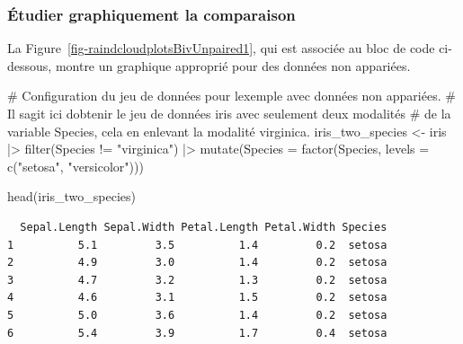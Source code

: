 \documentclass[
  letterpaper,
]{book}
\newenvironment{Shaded}{\begin{snugshade}}{\end{snugshade}}
\newcommand{\AttributeTok}[1]{\textcolor[rgb]{0.40,0.45,0.13}{#1}}
\newcommand{\CommentTok}[1]{\textcolor[rgb]{0.37,0.37,0.37}{#1}}
\newcommand{\FunctionTok}[1]{\textcolor[rgb]{0.28,0.35,0.67}{#1}}
\newcommand{\NormalTok}[1]{\textcolor[rgb]{0.00,0.23,0.31}{#1}}
\newcommand{\OtherTok}[1]{\textcolor[rgb]{0.00,0.23,0.31}{#1}}
\newcommand{\SpecialCharTok}[1]{\textcolor[rgb]{0.37,0.37,0.37}{#1}}
\newcommand{\StringTok}[1]{\textcolor[rgb]{0.13,0.47,0.30}{#1}}
\begin{document}
\subsubsection{Étudier graphiquement la
comparaison}\label{uxe9tudier-graphiquement-la-comparaison}

La Figure~\ref{fig-raindcloudplotsBivUnpaired1}, qui est associée au
bloc de code ci-dessous, montre un graphique approprié pour des données
non appariées.

\begin{Shaded}
\begin{Highlighting}[]
\CommentTok{\# Configuration du jeu de données pour l\textquotesingle{}exemple avec données non appariées.}
\CommentTok{\# Il s\textquotesingle{}agit ici d\textquotesingle{}obtenir le jeu de données \textasciigrave{}iris\textasciigrave{} avec seulement deux modalités  }
\CommentTok{\# de la variable \textasciigrave{}Species\textasciigrave{}, cela en enlevant la modalité \textasciigrave{}virginica\textasciigrave{}.}
\NormalTok{iris\_two\_species }\OtherTok{\textless{}{-}}
\NormalTok{  iris }\SpecialCharTok{|\textgreater{}} 
  \FunctionTok{filter}\NormalTok{(Species }\SpecialCharTok{!=} \StringTok{"virginica"}\NormalTok{) }\SpecialCharTok{|\textgreater{}} 
  \FunctionTok{mutate}\NormalTok{(}\AttributeTok{Species =} \FunctionTok{factor}\NormalTok{(Species, }\AttributeTok{levels =} \FunctionTok{c}\NormalTok{(}\StringTok{"setosa"}\NormalTok{, }\StringTok{"versicolor"}\NormalTok{)))}

\FunctionTok{head}\NormalTok{(iris\_two\_species)}
\end{Highlighting}
\end{Shaded}

\begin{verbatim}
  Sepal.Length Sepal.Width Petal.Length Petal.Width Species
1          5.1         3.5          1.4         0.2  setosa
2          4.9         3.0          1.4         0.2  setosa
3          4.7         3.2          1.3         0.2  setosa
4          4.6         3.1          1.5         0.2  setosa
5          5.0         3.6          1.4         0.2  setosa
6          5.4         3.9          1.7         0.4  setosa
\end{verbatim}
\end{document}
